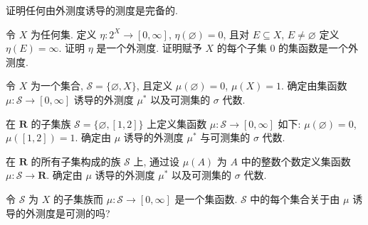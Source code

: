 \documentclass[../../main.tex]{subfiles}
\begin{document}
\begin{exercise}\label{exercise:ch17-19}
证明任何由外测度诱导的测度是完备的.
\end{exercise}

\begin{exercise}\label{exercise:ch17-20}
令 $X$ 为任何集. 定义 $\eta:2^{X}\to[0,\infty]$, $\eta(\varnothing)=0$, 且对 $E\subseteq X$, $E\neq\varnothing$ 定义 $\eta(E)=\infty$. 证明 $\eta$ 是一个外测度. 证明赋予 $X$ 的每个子集 $0$ 的集函数是一个外测度.
\end{exercise}

\begin{exercise}\label{exercise:ch17-21}
令 $X$ 为一个集合, $\mathcal{S}=\{\varnothing,X\}$, 且定义 $\mu(\varnothing)=0$, $\mu(X)=1$. 确定由集函数 $\mu:\mathcal{S}\to[0,\infty]$ 诱导的外测度 $\mu^*$ 以及可测集的 $\sigma$ 代数.
\end{exercise}

\begin{exercise}\label{exercise:ch17-22}
在 $\mathbf{R}$ 的子集族 $\mathcal{S}=\{\varnothing,[1,2]\}$ 上定义集函数 $\mu:\mathcal{S}\to[0,\infty]$ 如下: $\mu(\varnothing)=0$, $\mu([1,2])=1$. 确定由 $\mu$ 诱导的外测度 $\mu^*$ 与可测集的 $\sigma$ 代数.
\end{exercise}

\begin{exercise}\label{exercise:ch17-23}
在 $\mathbf{R}$ 的所有子集构成的族 $\mathcal{S}$ 上, 通过设 $\mu(A)$ 为 $A$ 中的整数个数定义集函数 $\mu:\mathcal{S}\to\mathbf{R}$. 确定由 $\mu$ 诱导的外测度 $\mu^*$ 以及可测集的 $\sigma$ 代数.
\end{exercise}

\begin{exercise}\label{exercise:ch17-24}
令 $\mathcal{S}$ 为 $X$ 的子集族而 $\mu:\mathcal{S}\to[0,\infty]$ 是一个集函数. $\mathcal{S}$ 中的每个集合关于由 $\mu$ 诱导的外测度是可测的吗?
\end{exercise}
\end{document}
